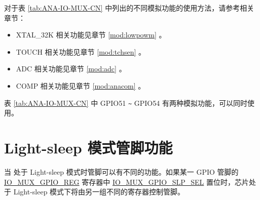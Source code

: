 \documentclass[main\_\_CN.tex]{subfiles}
\begin{document}
对于表 \ref{tab:ANA-IO-MUX-CN} 中列出的不同模拟功能的使用方法，请参考相关章节：

\begin{itemize}
    \item XTAL\_32K 相关功能见章节 \ref{mod:lowpowm} \textit{}。
    \item TOUCH 相关功能见章节 \ref{mod:tchsen} \textit{}。
    \item ADC 相关功能见章节 \ref{mod:adc} \textit{}。
    \item COMP 相关功能见章节 \ref{mod:anacom} \textit{}。
\end{itemize}

\begin{tiplisting}
    表 \ref{tab:ANA-IO-MUX-CN} 中 GPIO51 \verb+~+ GPIO54 有两种模拟功能，可以同时使用。
\end{tiplisting}

\section{Light-sleep 模式管脚功能}\label{sec:iomuxgpio-pin-func-light-sleep}

当 \chipname{} 处于 Light-sleep 模式时管脚可以有不同的功能。如果某一 GPIO 管脚的 \hyperref[regdesc:IOMUXGPIONREG]{IO\_MUX\_GPIO\_REG} 寄存器中 \hyperref[fielddesc:IOMUXGPIONSLPSEL]{IO\_MUX\_GPIO\_SLP\_SEL} 置位时，芯片处于 Light-sleep 模式下将由另一组不同的寄存器控制管脚。
\end{document}
